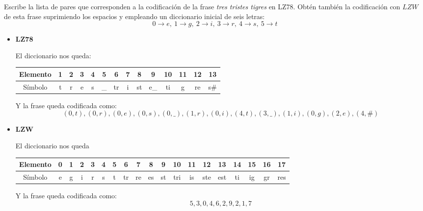 \begin{problem}[14]
Escribe la lista de pares que corresponden a la codificación de la frase \textit{tres tristes tigres} en LZ78. Obtén también la codificación con $LZW$ de esta frase suprimiendo los espacios y empleando un diccionario inicial de seis letras:
\[0 \to e, \ 1 \to g, \ 2 \to i, \ 3 \to r, \ 4 \to s, \ 5 \to t\]
\solution

\yoP

\begin{itemize}
\item \textbf{LZ78}

El diccionario nos queda:
\begin{center}
\begin{tabular}{ | c | c | c | c | c | c | c | c | c | c | c | c | c | c |}
   \hline
   Elemento & 1 & 2 & 3 & 4 & 5 & 6 & 7 & 8 & 9 & 10 & 11 & 12 & 13\\
   \hline
   Símbolo & t & r & e & s & \_ & tr & i & st & e\_ & ti & g & re &s\#\\
   \hline
 \end{tabular}
\end{center}

Y la frase queda codificada como:
\[(0,t),(0,r),(0,e),(0,s),(0,\_),(1, r),(0,i),(4,t),(3,\_),(1,i),(0,g),(2,e),(4,\#)\]


\item \textbf{LZW}

El diccionario nos queda

\begin{adjustwidth}{-2cm}{-2cm}
\begin{tabular}{ | c | c | c | c | c | c | c | c | c | c | c | c | c | c | c | c | c | c | c | }
   \hline
   Elemento & 0 & 1 & 2 & 3 & 4 & 5 & 6 & 7 & 8 & 9 & 10 & 11 & 12 & 13 & 14 & 15 & 16 & 17  \\
   \hline
   Símbolo & e & g & i & r & s & t & tr & re & es & st & tri & is & ste & est & ti & ig & gr & res\\
   \hline
 \end{tabular}
\end{adjustwidth}
Y la frase queda codificada como:
\[5,3,0,4,6,2,9,2,1,7\]
\end{itemize}
\end{problem}


